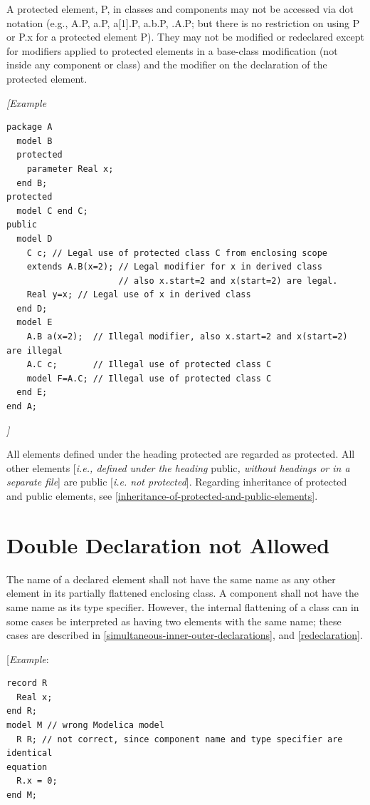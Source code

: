 \documentclass[10pt,a4paper]{report}
\def\doublelabel#1{\label{#1}}
\begin{document}
A protected element, P, in classes and components may not be accessed
via dot notation (e.g., A.P, a.P, a{[}1{]}.P, a.b.P, .A.P; but there is
no restriction on using P or P.x for a protected element P). They may
not be modified or redeclared except for modifiers applied to protected
elements in a base-class modification (not inside any component or
class) and the modifier on the declaration of the protected element.

\emph{{[}Example}
\begin{lstlisting}[language=modelica]
package A
  model B
  protected
    parameter Real x;
  end B;
protected
  model C end C;
public
  model D
    C c; // Legal use of protected class C from enclosing scope
    extends A.B(x=2); // Legal modifier for x in derived class
                      // also x.start=2 and x(start=2) are legal.
    Real y=x; // Legal use of x in derived class
  end D;
  model E
    A.B a(x=2);  // Illegal modifier, also x.start=2 and x(start=2) are illegal
    A.C c;       // Illegal use of protected class C
    model F=A.C; // Illegal use of protected class C
  end E;
end A;
\end{lstlisting}

\emph{{]}}

All elements defined under the heading protected are regarded as
protected. All other elements {[}\emph{i.e., defined under the heading}
public\emph{, without headings or in a separate file}{]} are public
{[}\emph{i.e. not protected}{]}. Regarding inheritance of protected and
public elements, see \ref{inheritance-of-protected-and-public-elements}.

\section{Double Declaration not Allowed}\doublelabel{double-declaration-not-allowed}

The name of a declared element shall not have the same name as any other
element in its partially flattened enclosing class. A component shall
not have the same name as its type specifier. However, the internal
flattening of a class can in some cases be interpreted as having two
elements with the same name; these cases are described in \ref{simultaneous-inner-outer-declarations},
and \ref{redeclaration}.

{[}\emph{Example}:
\begin{lstlisting}[language=modelica]
record R
  Real x;
end R;
model M // wrong Modelica model
  R R; // not correct, since component name and type specifier are identical
equation
  R.x = 0;
end M;
\end{lstlisting}
\end{document}
